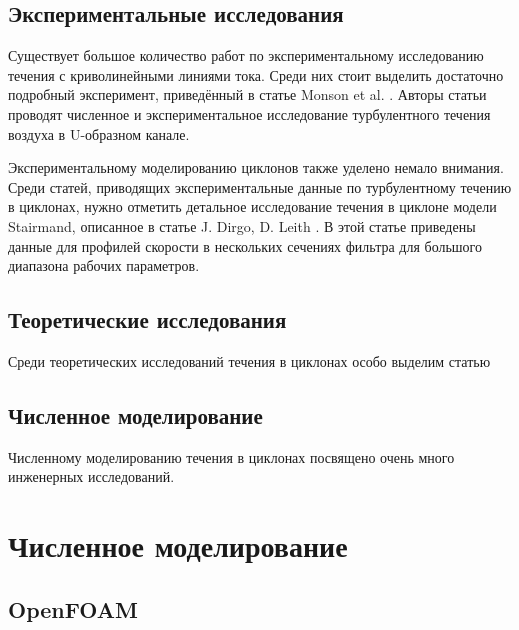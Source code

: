 \documentclass[pdftex,a4paper,12pt]{article}
\begin{document}
\subsection{Экспериментальные исследования}

	\hspace{2em}Существует большое количество работ по экспериментальному исследованию течения с криволинейными линиями тока. Среди них стоит выделить достаточно подробный эксперимент, приведённый в статье Monson et al. \cite{Monson}. Авторы статьи проводят численное и экспериментальное исследование турбулентного течения воздуха в U-образном канале.
	
	Экспериментальному моделированию циклонов также уделено немало внимания. Среди статей, приводящих экспериментальные данные по турбулентному течению в циклонах, нужно отметить детальное исследование течения в циклоне модели Stairmand, описанное в статье J. Dirgo, D. Leith \cite{DirgoLeith}. В этой статье приведены данные для профилей скорости в нескольких сечениях фильтра для большого диапазона рабочих параметров.
\subsection{Теоретические исследования}
	Среди теоретических исследований течения в циклонах особо выделим статью 
\subsection{Численное моделирование}
	
	Численному моделированию течения в циклонах посвящено очень много инженерных исследований. 
\newpage
\section{Численное моделирование}
\subsection{OpenFOAM}
\end{document}
